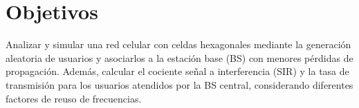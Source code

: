 \section{\LARGE Objetivos}
Analizar y simular una red celular con celdas hexagonales mediante la generación aleatoria de usuarios y asociarlos a la estación base (BS) con menores pérdidas de propagación. 
Además, calcular el cociente señal a interferencia (SIR) y la tasa de transmisión para los usuarios atendidos por la BS central, considerando diferentes factores de reuso de frecuencias.